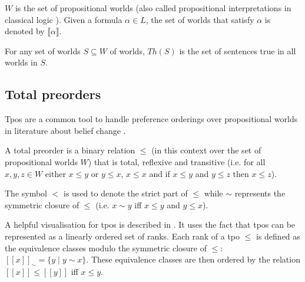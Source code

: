 \documentclass[english, 12pt]{scrartcl}
\theoremstyle{definition}
\theoremstyle{definition}
\theoremstyle{definition}
\newcommand{\modelsOf}[1]{\llbracket #1 \rrbracket}
\begin{document}
$W$ is the set of propositional worlds (also called propositional interpretations in classical logic \cite{Kai2020}). Given a formula $\alpha \in L$, the set of worlds that satisfy $\alpha$ is denoted by $\modelsOf{\alpha}$.

For any set of worlds $S \subseteq W$ of worlds, $Th(S)$ is the set of sentences true in all worlds in $S$.

\subsection{Total preorders}
Tpos are a common tool to handle preference orderings over propositional worlds in literature about belief change \cite{Booth2011}.

A total preorder is a binary relation $\leq$ (in this context over the set of propositional worlds $W$) that is total, reflexive and transitive (i.e. for all $x, y, z \in W$ either $x \leq y$ or $y \leq x$, $x \leq x$ and if $x \leq y$ and $y \leq z$ then $x \leq z$).

The symbol $<$ is used to denote the strict part of $\leq$ while $\sim$ represents the symmetric closure of $\leq$ (i.e. $x \sim y$ iff $x \leq y$ and $y \leq x$).

A helpful visualisation for tpos is described in \cite{Booth2006}. It uses the fact that tpos can be represented as a linearly ordered set of ranks. Each rank of a tpo $\leq$ is defined as the equivalence classes modulo the symmetric closure of $\leq$: $[[x]]_{\sim} = \{y \mid y \sim x\}$. These equivalence classes are then ordered by the relation $[[x]] \leq [[y]]$ iff $x \leq y$.
\end{document}
